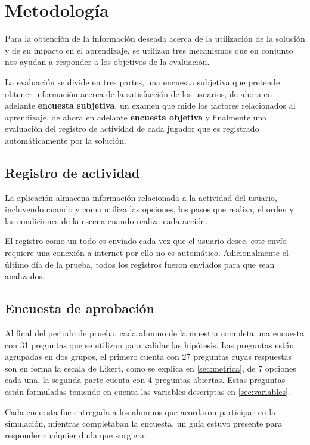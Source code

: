 \section{Metodología}

\label{sec:metodologia}

Para la obtención de la información deseada acerca de la utilización de la
solución y de su impacto en el aprendizaje, se utilizan tres mecanismos que en
conjunto nos ayudan a responder a los objetivos de la evaluación.

La evaluación se divide en tres partes, una encuesta subjetiva que pretende
obtener información acerca de la satisfacción de los usuarios, de ahora en
adelante \textbf{encuesta subjetiva}, un examen que mide los factores
relacionados al aprendizaje, de ahora en adelante \textbf{encuesta objetiva}  y
finalmente una evaluación del registro de actividad de cada jugador que es
registrado automáticamente por la solución.


\subsection{Registro de actividad}

La aplicación almacena información relacionada a la actividad del usuario,
incluyendo cuando y como utiliza las opciones, los pasos que realiza, el orden y
las condiciones de la escena cuando realiza cada acción.

El registro como un todo es enviado cada vez que el usuario desee, este envío
requiere una conexión a internet por ello no es automático. Adicionalmente el
último día de la prueba, todos los registros fueron enviados para que sean
analizados.


\subsection{Encuesta de aprobación}

Al final del periodo de prueba, cada alumno de la muestra completa una encuesta
con 31 preguntas que se utilizan para validar las hipótesis. Las preguntas están
agrupadas en dos grupos, el primero cuenta con 27 preguntas cuyas respuestas son
en forma la escala de  Likert, como se explica en \ref{sec:metrica}, de 7
opciones cada una, la segunda parte cuenta con 4 preguntas abiertas. Estas
preguntas están formuladas teniendo en cuenta las variables descriptas en
\ref{sec:variables}.

Cada encuesta fue entregada a los alumnos que acordaron participar en la
simulación, mientras completaban la encuesta, un guía estuvo presente para
responder cualquier duda que surgiera.

